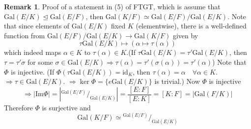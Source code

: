 \documentclass{article}
\theoremstyle{definition}
\newtheorem{rem}{Remark}
\newcommand*\quot[2]{{^{\textstyle #1}\big/_{\textstyle #2}}}
\newcommand{\Ra}{\Rightarrow}
\begin{document}
\begin{rem}
	Proof of a statement in (5) of FTGT, which is assume that $\text{Gal}(E/K) \trianglelefteq \text{Gal}(E/F)$, then $\text{Gal}(K/F) \simeq \text{Gal}(E/F) / \text{Gal}(E/K)$.
	Note that since elements of $\text{Gal}(E/K)$ fixed $K$ (elementwise), there is a well-defined function from $\text{Gal}(E/F)/\text{Gal}(E/K) \to \text{Gal}(K/F)$ given by 
	\[
		\tau \text{Gal}(E/K) \mapsto (\alpha \mapsto \tau(\alpha))
	\]
	which indeed maps $\alpha \in K$ to $\tau(\alpha) \in K$.(If $\tau \text{Gal}(E/K) = \tau' \text{Gal}(E/K)$, then $\tau = \tau' \sigma$ for some $\sigma \in \text{Gal}(E/K) \Ra \tau(\alpha) = \tau'(\sigma(\alpha)) = \tau'(\alpha)$)
	Note that $\Phi$ is injective.
	(If $\Phi( \tau \text{Gal}(E/K)) = \text{id}_K$, then $\tau(\alpha) = \alpha \quad \forall \alpha \in K$.
	$\Ra \tau \in \text{Gal}(E/K)$.
	$\Ra \ker \Phi = \{e \text{Gal}(E/K)\}$ is trivial.)
	Now $\Phi$ is injective 
	\[
		\Ra |\text{Im}\Phi| = \left|\quot{\text{Gal}(E/F)}{\text{Gal}(E/K)} \right| = \frac{[E:F]}{[E:K]} = [K:F] = |\text{Gal}(F/K) |
	\]
	Therefore $\Phi$ is surjective and 
	\[
		\text{Gal}(K/F) \simeq \quot{\text{Gal}(E/F)}{\text{Gal}(E/K)}
	\]
\end{rem}
\end{document}
